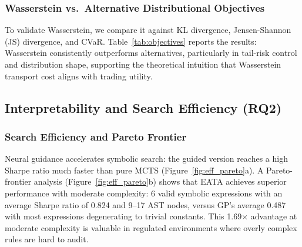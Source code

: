 \subsubsection{Wasserstein vs.\ Alternative Distributional Objectives}

To validate Wasserstein, we compare it against KL divergence, Jensen-Shannon (JS) divergence, and CVaR. Table~\ref{tab:objectives} reports the results: Wasserstein consistently outperforms alternatives, particularly in tail-risk control and distribution shape, supporting the theoretical intuition that Wasserstein transport cost aligns with trading utility.

\begin{table}[htbp]
\centering
\caption{Performance Comparison Across Distributional Objectives }
\label{tab:objectives}
\end{table}

\subsection{Interpretability and Search Efficiency (RQ2)}

\subsubsection{Search Efficiency and Pareto Frontier}
Neural guidance accelerates symbolic search: the guided version reaches a high Sharpe ratio much faster than pure MCTS (Figure~\ref{fig:eff_pareto}a). A Pareto-frontier analysis (Figure~\ref{fig:eff_pareto}b) shows that EATA achieves superior performance with moderate complexity: 6 valid symbolic expressions with an average Sharpe ratio of 0.824 and 9--17 AST nodes, versus GP's average 0.487 with most expressions degenerating to trivial constants. This 1.69$\times$ advantage at moderate complexity is valuable in regulated environments where overly complex rules are hard to audit.

